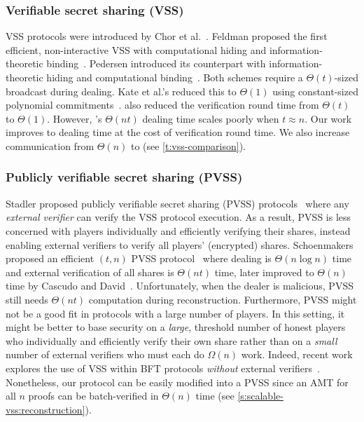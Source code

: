 \subsubsection{Verifiable secret sharing (VSS)}
VSS protocols were introduced by Chor et al.~\cite{CGMA85}.
Feldman proposed the first efficient, non-interactive VSS with computational hiding and information-theoretic binding~\cite{Feldman1987Practical}.
Pedersen introduced its counterpart with information-theoretic hiding and computational binding~\cite{Pedersen1991Noninteractive}.
Both schemes require a $\Theta(t)$-sized broadcast during dealing.
Kate et al.'s \evss reduced this to $\Theta(1)$ using constant-sized polynomial commitments~\cite{polycommit}.
\evss also reduced the verification round time from $\Theta(t)$ to $\Theta(1)$.
However, \evss's $\Theta(nt)$ dealing time scales poorly when $t\approx n$.
Our work improves \evss to \amtDealTime dealing time at the cost of \amtOneShareVerifTime verification round time.
We also increase communication from $\Theta(n)$ to \amtAllShareVerifTime (see \cref{t:vss-comparison}).

\subsubsection{Publicly verifiable secret sharing (PVSS)}
Stadler proposed publicly verifiable secret sharing (PVSS) protocols~\cite{Stadler1996Publicly} where any \textit{external verifier} can verify the VSS protocol execution.
As a result, PVSS is less concerned with players individually and efficiently verifying their shares, instead enabling external verifiers to verify all players' (encrypted) shares.
Schoenmakers proposed an efficient $(t,n)$ PVSS protocol~\cite{Schoenmakers1999ASimple} where dealing is $\Theta(n\log{n})$ time and external verification of all shares is $\Theta(nt)$ time, later improved to $\Theta(n)$ time by Cascudo and David~\cite{scrape}.
Unfortunately, when the dealer is malicious, PVSS still needs $\Theta(nt)$ computation during reconstruction.
Furthermore, PVSS might not be a good fit in protocols with a large number of players.
In this setting, it might be better to base security on a \textit{large}, threshold number of honest players who individually and efficiently verify their own share rather than on a \textit{small} number of external verifiers who must each do $\Omega(n)$ work.
Indeed, recent work explores the use of VSS within BFT protocols \textit{without} external verifiers~\cite{BTA+19}.
Nonetheless, our \ourvss protocol can be easily modified into a PVSS since an AMT for all $n$ proofs can be batch-verified in $\Theta(n)$ time (see \cref{s:scalable-vss:reconstruction}).

